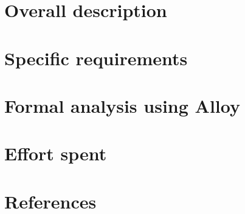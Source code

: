 \documentclass[11pt]{article}
\begin{document}
\section{Overall description}


\clearpage
\section{Specific requirements}


\clearpage
\section{Formal analysis using Alloy}


\clearpage
\section{Effort spent}


\clearpage
\section{References}

\end{document}
